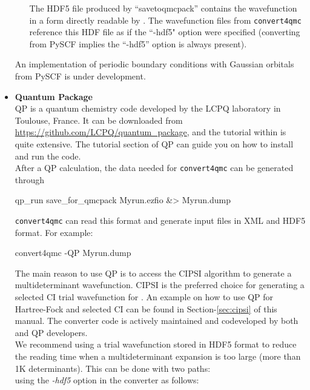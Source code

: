 \begin{itemize}
\begin{itemize}
The HDF5 file produced by ``savetoqmcpack'' contains the wavefunction in a form directly readable by \qmcpack.
The wavefunction files from \texttt{convert4qmc} reference this HDF file as if the ``-hdf5" option were specified
(converting from PySCF implies the ``-hdf5'' option is always present).

\end{itemize}

 An implementation of periodic boundary conditions with Gaussian orbitals from PySCF is under development. 

\item \textbf{Quantum Package}\\
QP\cite{QP} is a quantum chemistry code developed by the LCPQ laboratory in Toulouse, France. It can be downloaded from \url{https://github.com/LCPQ/quantum_package}, and the tutorial within is quite extensive. The tutorial section of QP can guide you on how to install and run the code.\\

After a QP calculation, the data needed for \texttt{convert4qmc} can be generated through\\
\begin{shade}
 qp_run save_for_qmcpack Myrun.ezfio &> Myrun.dump
\end{shade}

\texttt{convert4qmc} can read this format and generate \qmcpack input files in XML and HDF5 format.  For example:

\begin{shade}
 convert4qmc -QP Myrun.dump
\end{shade}


The main reason to use QP is to access the CIPSI algorithm to generate a multideterminant wavefunction.
CIPSI is the preferred choice for generating a selected CI trial wavefunction for \qmcpack. 
An example on how to use QP for Hartree-Fock and selected CI can be found in Section-\ref{sec:cipsi}  of this manual.
The converter code is actively maintained and codeveloped by both \qmcpack and QP developers.\\

We recommend using a trial wavefunction stored in HDF5 format to reduce the reading time when a multideterminant expansion is too large (more than 1K determinants). This can be done with two paths:\\

using the \textit{-hdf5} option in the converter as follows:\\


\end{itemize}
